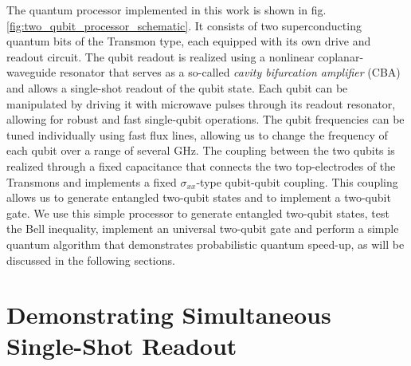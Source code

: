 The quantum processor implemented in this work is shown in fig. \ref{fig:two_qubit_processor_schematic}. It consists of two superconducting quantum bits of the Transmon type, each equipped with its own drive and readout circuit. The qubit readout is realized using a nonlinear coplanar-waveguide resonator that serves as a so-called {\it cavity bifurcation amplifier} (CBA)\citep{siddiqi_dispersive_2006,mallet_single-shot_2009,vijay_invited_2009} and allows a single-shot readout of the qubit state. Each qubit can be manipulated by driving it with microwave pulses through its readout resonator, allowing for robust and fast single-qubit operations. The qubit frequencies can be tuned individually using fast flux lines, allowing us to change the frequency of each qubit over a range of several GHz. The coupling between the two qubits is realized through a fixed capacitance that connects the two top-electrodes of the Transmons and implements a fixed $\sigma_{xx}$-type qubit-qubit coupling. This coupling allows us to generate entangled two-qubit states and to implement a two-qubit gate. We use this simple processor to generate entangled two-qubit states, test the Bell inequality, implement an universal two-qubit gate and perform a simple quantum algorithm that demonstrates probabilistic quantum speed-up, as will be discussed in the following sections.

\section{Demonstrating Simultaneous Single-Shot Readout}

